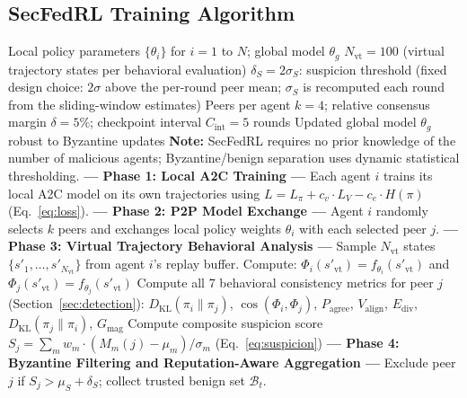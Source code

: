 \documentclass[12pt,a4paper]{article}
\begin{document}
\subsection{SecFedRL Training Algorithm}

\begin{algorithm}[htbp]
\caption{SecFedRL Full Round-Level Training}
\label{alg:secfedrl}
\begin{algorithmic}[1]
\Require Local policy parameters $\{\theta_i\}$ for $i = 1$ to $N$; global model $\theta_g$
\Require $N_{\text{vt}} = 100$ (virtual trajectory states per behavioral evaluation)
\Require $\delta_S = 2\sigma_S$: suspicion threshold (fixed design choice: $2\sigma$ above the per-round peer mean; $\sigma_S$ is recomputed each round from the sliding-window estimates)
\Require Peers per agent $k = 4$; relative consensus margin $\delta = 5\%$; checkpoint interval $C_{\text{int}} = 5$ rounds
\Ensure Updated global model $\theta_g$ robust to Byzantine updates
\State \textbf{Note:} SecFedRL requires no prior knowledge of the number of malicious agents; Byzantine/benign separation uses dynamic statistical thresholding.
  \State \textbf{--- Phase 1: Local A2C Training ---}
  \State Each agent $i$ trains its local A2C model on its own trajectories using $L = L_\pi + c_v\cdot L_V - c_e\cdot H(\pi)$ (Eq.~\ref{eq:loss}).
  \State \textbf{--- Phase 2: P2P Model Exchange ---}
  \State Agent $i$ randomly selects $k$ peers and exchanges local policy weights $\theta_i$ with each selected peer $j$.
  \State \textbf{--- Phase 3: Virtual Trajectory Behavioral Analysis ---}
    \State Sample $N_{\text{vt}}$ states $\{s'_1,\ldots,s'_{N_{\text{vt}}}\}$ from agent $i$'s replay buffer.
      \State Compute: $\Phi_i(s'_{\text{vt}}) = f_{\theta_i}(s'_{\text{vt}})$ and $\Phi_j(s'_{\text{vt}}) = f_{\theta_j}(s'_{\text{vt}})$
    \EndFor
    \State Compute all 7 behavioral consistency metrics for peer $j$ (Section~\ref{sec:detection}):
    \State \hspace{1em}$D_{\text{KL}}(\pi_i\|\pi_j)$, $\cos(\Phi_i,\Phi_j)$, $P_{\text{agree}}$, $V_{\text{align}}$, $E_{\text{div}}$, $D_{\text{KL}}(\pi_j\|\pi_i)$, $G_{\text{mag}}$
    \State Compute composite suspicion score $S_j = \sum_m w_m\cdot(M_m(j)-\mu_m)/\sigma_m$ (Eq.~\ref{eq:suspicion})
  \EndFor
  \State \textbf{--- Phase 4: Byzantine Filtering and Reputation-Aware Aggregation ---}
  \State Exclude peer $j$ if $S_j > \mu_S + \delta_S$; collect trusted benign set $\mathcal{B}_t$.

\end{algorithmic}
\end{algorithm}
\end{document}
